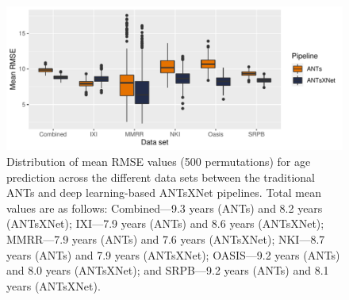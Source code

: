 \documentclass[12pt,]{article}
\begin{document}
\begin{figure}[htb]
  \centering
    \includegraphics[width=\textwidth]{Figures/rmseThicknessPerSite.pdf}
  \caption{Distribution of mean RMSE values (500 permutations) for age
          prediction across the different data sets between
          the traditional ANTs and deep learning-based ANTsXNet pipelines. Total
          mean values are as follows: Combined---9.3 years (ANTs) and 8.2 years
          (ANTsXNet); IXI---7.9 years (ANTs) and 8.6 years (ANTsXNet);
          MMRR---7.9 years (ANTs) and 7.6 years (ANTsXNet); NKI---8.7 years
          (ANTs) and 7.9 years (ANTsXNet); OASIS---9.2 years (ANTs) and 8.0
          years (ANTsXNet); and SRPB---9.2 years (ANTs) and 8.1 years
          (ANTsXNet).}
  \label{fig:agePrediction}
\end{figure}
\end{document}
